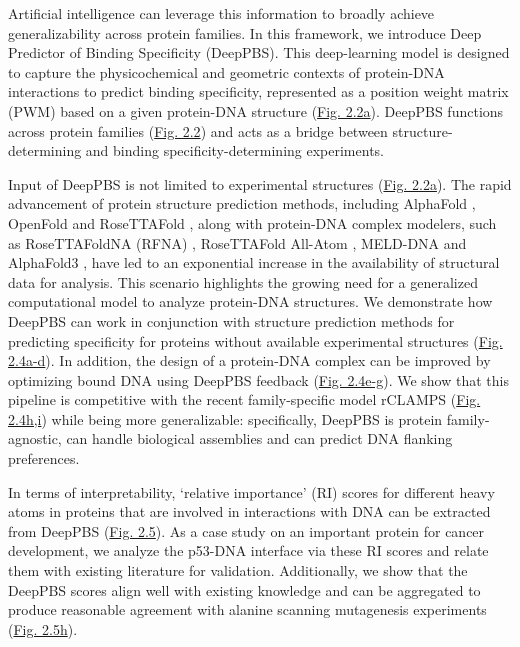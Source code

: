 Artificial intelligence can leverage this information to broadly achieve generalizability across protein families. In this framework, we introduce Deep Predictor of Binding Specificity (DeepPBS). This deep-learning model is designed to capture the physicochemical and geometric contexts of protein-DNA interactions to predict binding specificity, represented as a position weight matrix (PWM) \citep{Stormo2013} based on a given protein-DNA structure (\hyperref[fig:pdna1]{Fig. 2.2a}). DeepPBS functions across protein families (\hyperref[fig:pdna1]{Fig. 2.2}) and acts as a bridge between structure-determining and binding specificity-determining experiments. 
\par
Input of DeepPBS is not limited to experimental structures (\hyperref[fig:pdna1]{Fig. 2.2a}). The rapid advancement of protein structure prediction methods, including AlphaFold \citep{Jumper2021}, OpenFold \citep{Ahdritz2024} and RoseTTAFold \citep{Baek2021}, along with protein-DNA complex modelers, such as RoseTTAFoldNA (RFNA) \citep{baek2024na}, RoseTTAFold All-Atom \citep{Krishna2024}, MELD-DNA \citep{Esmaeeli2023} and AlphaFold3 \citep{Abramson2024}, have led to an exponential increase in the availability of structural data for analysis. This scenario highlights the growing need for a generalized computational model to analyze protein-DNA structures. We demonstrate how DeepPBS can work in conjunction with structure prediction methods for predicting specificity for proteins without available experimental structures (\hyperref[fig:pdna3]{Fig. 2.4a-d}). In addition, the design of a protein-DNA complex can be improved by optimizing bound DNA using DeepPBS feedback (\hyperref[fig:pdna3]{Fig. 2.4e-g}). We show that this pipeline is competitive with the recent family-specific model rCLAMPS \citep{Wetzel2022} (\hyperref[fig:pdna3]{Fig. 2.4h,i}) while being more generalizable: specifically, DeepPBS is protein family-agnostic, can handle biological assemblies and can predict DNA flanking preferences.
\par
In terms of interpretability, ‘relative importance’ (RI) scores for different heavy atoms in proteins that are involved in interactions with DNA can be extracted from DeepPBS (\hyperref[fig:pdna4]{Fig. 2.5}). As a case study on an important protein for cancer development, we analyze the p53-DNA interface via these RI scores and relate them with existing literature for validation. Additionally, we show that the DeepPBS scores align well with existing knowledge and can be aggregated to produce reasonable agreement with alanine scanning mutagenesis experiments \citep{Morrison2001} (\hyperref[fig:pdna4]{Fig. 2.5h}).
